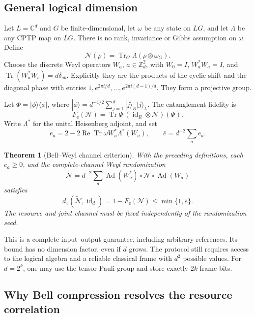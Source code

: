 \documentclass[11pt,reqno]{amsart}
\numberwithin{equation}{section}
\newtheorem{theorem}{Theorem}[section]
\theoremstyle{definition}
\theoremstyle{remark}
\newcommand{\Tr}{\operatorname{Tr}}
\newcommand{\id}{\operatorname{id}}
\newcommand{\Ad}{\operatorname{Ad}}
\newcommand{\Rea}{\operatorname{Re}}
\newcommand{\Ncal}{\mathcal N}
\newcommand{\Fe}{F_{\mathrm e}}
\newcommand{\diam}{d_\diamond}
\begin{document}
\subsection{General logical dimension}

Let \(L=\mathbb C^d\) and \(G\) be finite-dimensional, let \(\omega\) be
any state on \(LG\), and let \(\Lambda\) be any CPTP map on \(LG\).
There is no rank, invariance or Gibbs assumption on \(\omega\).
Define
\[
 \Ncal(\rho)=\Tr_G\Lambda(\rho\otimes\omega_G).
\]
Choose the discrete Weyl operators \(W_a\), \(a\in\mathbb Z_d^2\),
with \(W_0=I\), \(W_a^*W_a=I\), and
\(\Tr(W_a^*W_b)=d\delta_{ab}\). Explicitly they are the products of
the cyclic shift and the diagonal phase with entries
\(1,e^{2\pi i/d},\ldots,e^{2\pi i(d-1)/d}\).
They form a projective group.

Let \(\Phi=|\phi\rangle\langle\phi|\), where
\(|\phi\rangle=d^{-1/2}\sum_{j=1}^d|j\rangle_R|j\rangle_L\).
The entanglement fidelity is
\[
             \Fe(\Ncal)=\Tr\Phi\,(\id_R\otimes\Ncal)(\Phi).
\]
Write \(\Lambda^*\) for the unital Heisenberg adjoint, and set
\begin{equation}\label{eq:general-errors}
 e_a=2-2\Rea\Tr\omega W_a^*\Lambda^*(W_a),
 \qquad \bar e=d^{-2}\sum_a e_a.
\end{equation}

\begin{theorem}[Bell--Weyl channel criterion]\label{thm:bell}
With the preceding definitions, each \(e_a\ge0\), and the complete-channel
Weyl randomization
\[
 \widetilde{\Ncal}
   =d^{-2}\sum_a\Ad(W_a^*)\circ\Ncal\circ\Ad(W_a)
\]
satisfies
\begin{equation}\label{eq:bell-result}
 \diam(\widetilde{\Ncal},\id_d)
             =1-\Fe(\Ncal)\le\min\{1,\bar e\}.
\end{equation}
The resource and joint channel must be fixed independently of the
randomization seed.
\end{theorem}

This is a complete input--output guarantee, including arbitrary references.
Its bound has no dimension factor, even if \(d\) grows. The protocol still
requires access to the logical algebra and a reliable classical frame with
\(d^2\) possible values. For \(d=2^k\), one may use the tensor-Pauli group
and store exactly \(2k\) frame bits.

\subsection{Why Bell compression resolves the resource correlation}
\end{document}
